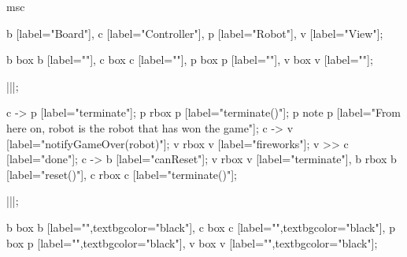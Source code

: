 \begin{msc}
msc
{

b [label="Board"],
c [label="Controller"],
p [label="Robot"],
v [label="View"];

b box b [label=""],
c box c [label=""],
p box p [label=""],
v box v [label=""];

|||;

c -> p [label="terminate"];
p rbox p [label="terminate()"];
p note p [label="From here on, robot is the robot that has won the game"];
c -> v [label="notifyGameOver(robot)"];
v rbox v [label="fireworks"];
v >> c [label="done"];
c -> b [label="canReset"];
v rbox v [label="terminate"],
b rbox b [label="reset()"],
c rbox c [label="terminate()"];


|||;

b box b [label="",textbgcolor="black"],
c box c [label="",textbgcolor="black"],
p box p [label="",textbgcolor="black"],
v box v [label="",textbgcolor="black"];

}
\end{msc}
